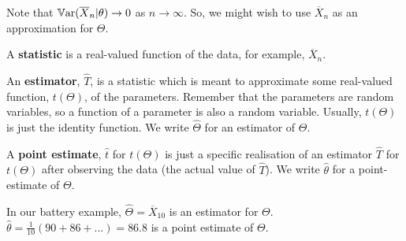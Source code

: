 \documentclass[a4paper]{article}
\begin{document}
            Note that $\mathbb{V}\text{ar}(\overline X_n | \theta) \to 0$ as $n \to \infty$.
            So, we might wish to use $\overline X_n$ as an approximation for
            $\Theta$.

            \begin{definition}
                A \textbf{statistic} is a real-valued function of the data, for
                example, $\overline X_n$.

                An \textbf{estimator}, $\widehat T$, is a statistic which is
                meant to approximate some real-valued function, $t(\Theta)$, of
                the parameters. Remember that the parameters are random
                variables, so a function of a parameter is also a random
                variable. Usually, $t(\Theta)$ is just the identity function. We
                write $\widehat \Theta$ for an estimator of $\Theta$.

                A \textbf{point estimate}, $\widehat t$ for $t(\Theta)$ is just
                a specific realisation of an estimator $\widehat T$ for
                $t(\Theta)$ after observing the data (the actual value of
                $\widehat T$). We write $\widehat \theta$ for a point-estimate
                of $\Theta$.
            \end{definition}

            In our battery example, $\widehat \Theta = \overline X_{10}$ is an
            estimator for $\Theta$. $\widehat \theta = \frac{1}{10} (90 + 86 +
            ...) = 86.8$ is a point estimate of $\Theta$.
\end{document}
